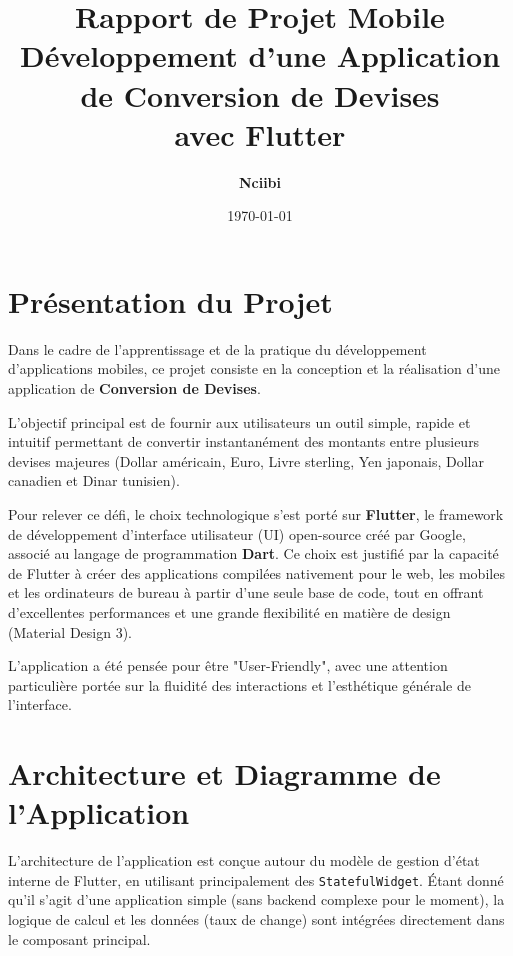 \documentclass[12pt,a4paper]{article}
\title{
    \vspace{2cm}
    \textbf{\Huge Rapport de Projet Mobile} \\
    \vspace{0.5cm}
    \Large Développement d'une Application de Conversion de Devises \\ avec Flutter
    \vspace{2cm}
}
\author{\textbf{Nciibi}}
\date{\today}
\begin{document}
\maketitle
\thispagestyle{empty} %

\newpage

\tableofcontents

\newpage

\section{Présentation du Projet}

Dans le cadre de l'apprentissage et de la pratique du développement d'applications mobiles, ce projet consiste en la conception et la réalisation d'une application de \textbf{Conversion de Devises}. 

L'objectif principal est de fournir aux utilisateurs un outil simple, rapide et intuitif permettant de convertir instantanément des montants entre plusieurs devises majeures (Dollar américain, Euro, Livre sterling, Yen japonais, Dollar canadien et Dinar tunisien). 

Pour relever ce défi, le choix technologique s'est porté sur \textbf{Flutter}, le framework de développement d'interface utilisateur (UI) open-source créé par Google, associé au langage de programmation \textbf{Dart}. Ce choix est justifié par la capacité de Flutter à créer des applications compilées nativement pour le web, les mobiles et les ordinateurs de bureau à partir d'une seule base de code, tout en offrant d'excellentes performances et une grande flexibilité en matière de design (Material Design 3).

L'application a été pensée pour être "User-Friendly", avec une attention particulière portée sur la fluidité des interactions et l'esthétique générale de l'interface.

\section{Architecture et Diagramme de l'Application}

L'architecture de l'application est conçue autour du modèle de gestion d'état interne de Flutter, en utilisant principalement des \texttt{StatefulWidget}. Étant donné qu'il s'agit d'une application simple (sans backend complexe pour le moment), la logique de calcul et les données (taux de change) sont intégrées directement dans le composant principal.
\end{document}
